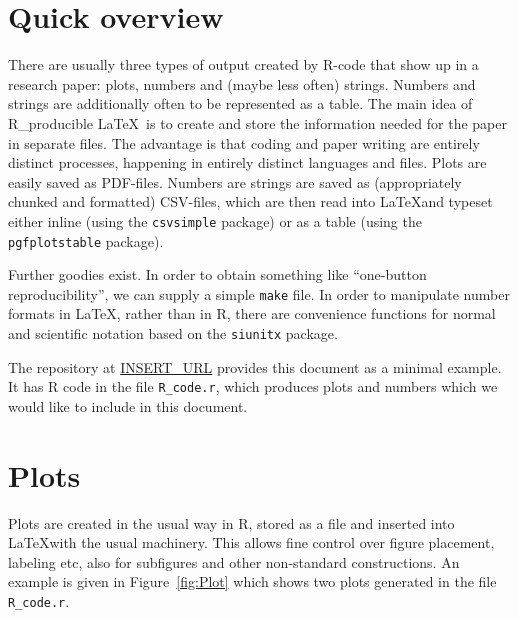 \documentclass[fleqn,reqno,10pt]{article}
\begin{document}
\section*{Quick overview}

There are usually three types of output created by R-code that show up in a research paper:
plots, numbers and (maybe less often) strings. Numbers and strings are additionally often to be
represented as a table. The main idea of R\_producible \LaTeX\ is to create and store the
information needed for the paper in separate files. The advantage is that coding and paper
writing are entirely distinct processes, happening in entirely distinct languages and
files. Plots are easily saved as PDF-files. Numbers are strings are saved as (appropriately
chunked and formatted) CSV-files, which are then read into \LaTeX and typeset either inline
(using the \texttt{csvsimple} package) or as a table (using the \texttt{pgfplotstable}
package). 

Further goodies exist. In order to obtain something like ``one-button reproducibility'', we can
supply a simple \texttt{make} file. In order to manipulate number formats in \LaTeX, rather
than in R, there are convenience functions for normal and scientific notation based on the
\texttt{siunitx} package.

The repository at \url{INSERT_URL} provides this document as a minimal example. It has R code
in the file \texttt{R\_code.r}, which produces plots and numbers which we would like to include
in this document.

\section*{Plots}

Plots are created in the usual way in R, stored as a file and inserted into \LaTeX with the
usual machinery. This allows fine control over figure placement, labeling etc, also for
subfigures and other non-standard constructions. An example is given in Figure~\ref{fig:Plot}
which shows two plots generated in the file \verb|R_code.r|.
\end{document}
